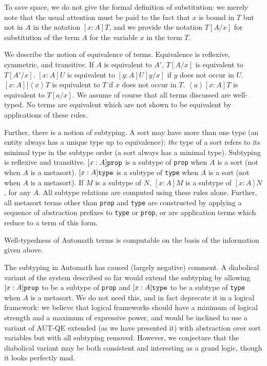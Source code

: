 \documentclass[submission,copyright,creativecommons]{eptcs}
\begin{document}
To save space, we do not give the formal definition of substitution:  we merely note that the usual attention must be paid to the fact that $x$ is bound in $T$ but not in $A$ in the notation $[x:A]T$, and we provide the notation $T[A/x]$ for substitution of the term $A$ for the variable $x$ in the term $T$.

We describe the notion of equivalence of terms.  Equivalence is reflexive, symmetric, and transitive.  If $A$ is equivalent to $A'$, $T[A/x]$ is equivalent to $T[A'/x]$.  $[x:A]U$ is equivalent to $[y:A]U[y/x]$ if $y$ does not occur in $U$.  $[x:A][\left<x\right>T$ is equivalent to $T$ if $x$ does not occur in $T$.
$\left<a\right>[x:A]T$ is equivalent to $T[a/x]$.  We assume of course that all terms discussed are well-typed.  No terms are equivalent which are not shown to be equivalent by applications of these rules.

Further, there is a notion of subtyping.  A sort may have more than one type (an entity always has a unique type up to equivalence):  {\em the\/} type of a sort refers to its minimal type in the subtype order (a sort always has a minimal type).  Subtyping is reflexive and transitive.  $[x:A]{\tt prop}$ is a subtype of {\tt prop} when $A$ is a sort (not when $A$ is a metasort).  $[x:A]{\tt type}$ is a subtype of {\tt type} when $A$ is a sort (not when $A$ is a metasort).  If $M$ is a subtype of $N$, $[x:A]M$ is a subtype of $[x:A]N$, for any $A$.  All subtype relations are computed using these rules alone.  Further, all metasort terms other than {\tt prop} and {\tt type} are constructed by applying a sequence of abstraction prefixes to
{\tt type} or {\tt prop}, or are application terms which reduce to a term of this form.

Well-typedness of Automath terms is computable on the basis of the information given above.

The subtyping in Automath has caused (largely negative) comment.  A diabolical variant of the system described so far would extend the subtyping by
allowing $[x:A]{\tt prop}$ to be a subtype of {\tt prop} and $[x:A]{\tt type}$ to be a subtype of {\tt type} when $A$ is a metasort.  We do not need this, and in fact deprecate it in a logical framework:  we believe that logical frameworks should have a minimum of logical strength and a maximum of expressive power, and would be inclined to use a variant of AUT-QE extended (as we have presented it) with abstraction over sort variables but with all subtyping removed.  However, we conjecture that the diabolical variant may be both consistent and interesting as a grand logic, though it looks perfectly mad.
\end{document}
